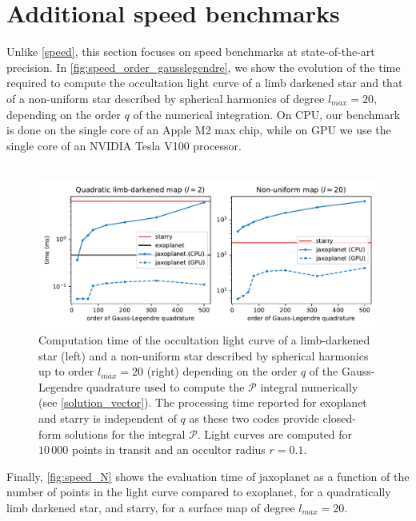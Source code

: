 \documentclass[modern]{aastex631}
\begin{document}
\section{Additional speed benchmarks}\label{precise_speed}
Unlike \autoref{speed}, this section focuses on speed benchmarks at state-of-the-art precision. In \autoref{fig:speed_order_gausslegendre}, we show the evolution of the time required to compute the occultation light curve of a limb darkened star and that of a non-uniform star described by spherical harmonics of degree $l_{max}=20$, depending on the order $q$ of the numerical integration. On CPU, our benchmark is done on the single core of an Apple M2 max chip, while on GPU we use the single core of an NVIDIA Tesla V100 processor.\\\\
\begin{figure}[H]
    \begin{center} 
        \includegraphics[width=\textwidth]{../workflows/speed/figures/speed_vs_order.pdf}
        \caption{Computation time of the occultation light curve of a limb-darkened star (left) and a non-uniform star described by spherical harmonics up to order $l_{max}=20$ (right) depending on the order $q$ of the Gauss-Legendre quadrature used to compute the $\mathcal{P}$ integral numerically (see \autoref{solution_vector}). The processing time reported for \textsf{exoplanet} and \textsf{starry} is independent of $q$ as these two codes provide closed-form solutions for the integral $\mathcal{P}$. Light curves are computed for $10\,000$ points in transit and an occultor radius $r=0.1$. }
        \label{fig:speed_order_gausslegendre}
    \end{center}
\end{figure}
Finally, \autoref{fig:speed_N} shows the evaluation time of \textsf{jaxoplanet} as a function of the number of points in the light curve compared to \textsf{exoplanet}, for a quadratically limb darkened star, and \textsf{starry}, for a surface map of degree $l_{max} = 20$. 
\end{document}
